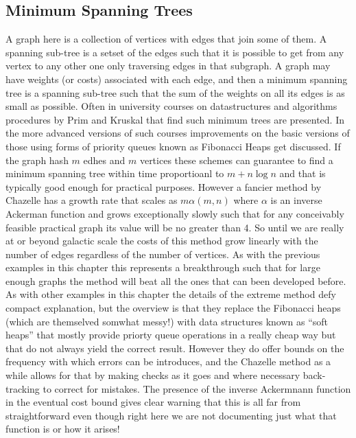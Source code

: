 \subsection{Minimum Spanning Trees}
A graph here is a collection of vertices with edges that join some of them.
A spanning sub-tree is a setset of the edges such that it is possible to
get from any vertex to any other one only traversing edges in that subgraph.
A graph may have weights (or costs) associated with each edge, and
then a minimum spanning tree is a spanning sub-tree such that the sum of the
weights on all its edges is as small as possible. Often in university courses
on datastructures and algorithms procedures by Prim and
Kruskal\cite{PrimKruskal} that find such minimum trees are presented. In
the more advanced versions of such courses improvements on the basic
versions of those using forms of priority queues known as Fibonacci
Heaps\cite{FibHeap} get discussed. If the graph hash $m$ edhes and $m$
vertices these schemes can guarantee to find a minimum spanning tree
within time proportioanl to $m + n \log n$ and that is typically good enough
for practical purposes. However a fancier method by Chazelle\cite{chazelle}
has a growth rate that scales as $m \alpha(m,n)$ where $\alpha$ is an
inverse Ackerman function and grows exceptionally slowly such that
for any conceivably feasible practical graph its value will be no
greater than 4. So until we are really at or beyond galactic scale the
costs of this method grow linearly with the number of edges regardless of
the number of vertices. As with the previous examples in this chapter this
represents a breakthrough such that for large enough graphs the method
will beat all the ones that can been developed before. As with other examples
in this chapter the details of the extreme method defy compact explanation,
but the overview is that they replace the Fibonacci heaps (which are themselved
somwhat messy!) with data structures known as ``soft heaps'' that mostly
provide priorty queue operations in a really cheap way but that
do not always yield the correct result. However they do offer bounds on
the frequency with which errors can be introduces, and the Chazelle method
as a while allows for that by making checks as it goes and where necessary
back-tracking to correct for mistakes. The presence of the inverse
Ackermnann function in the eventual cost bound gives clear warning that
this is all far from straightforward even though right here we are not
documenting just what that function is or how it arises!

